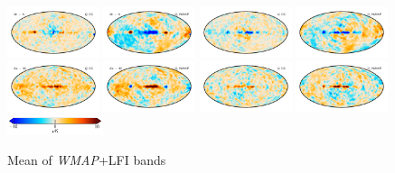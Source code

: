 \documentclass[twocolumn]{../../common/aa}
\begin{document}
\begin{figure}
	\centering
	\includegraphics[width=0.24\textwidth]{figures/K30_deltaQ.pdf}
	\includegraphics[width=0.24\textwidth]{figures/K30_W_deltaQ.pdf}
	\includegraphics[width=0.24\textwidth]{figures/K30_deltaU.pdf}
	\includegraphics[width=0.24\textwidth]{figures/K30_W_deltaU.pdf}
	\includegraphics[width=0.24\textwidth]{figures/30Ka_deltaQ.pdf}
	\includegraphics[width=0.24\textwidth]{figures/30Ka_W_deltaQ.pdf}
	\includegraphics[width=0.24\textwidth]{figures/30Ka_deltaU.pdf}
	\includegraphics[width=0.24\textwidth]{figures/30Ka_W_deltaU.pdf}
        \includegraphics[width=0.25\textwidth]{figures/cbar_10uK.pdf}
	\caption{Mean of \textit{WMAP}+LFI bands}
\end{figure}
\end{document}
